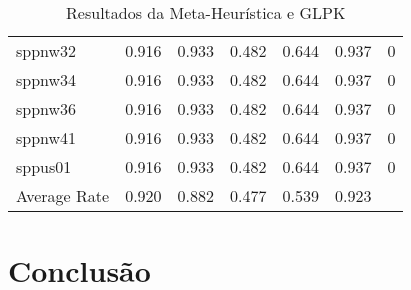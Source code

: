 \documentclass[a4paper, 10pt]{article} %
\begin{document}
\begin{table}[h]
\begin{tabular}{l c c c c c c}
sppnw32 & 0.916 & 0.933 & 0.482 & 0.644 & 0.937 & 0\\
sppnw34 & 0.916 & 0.933 & 0.482 & 0.644 & 0.937 & 0\\
sppnw36 & 0.916 & 0.933 & 0.482 & 0.644 & 0.937 & 0\\
sppnw41 & 0.916 & 0.933 & 0.482 & 0.644 & 0.937 & 0\\
sppus01 & 0.916 & 0.933 & 0.482 & 0.644 & 0.937 & 0\\
\midrule %
\midrule %
Average Rate & 0.920 & 0.882 & 0.477 & 0.539 & 0.923\\ %
\bottomrule %
\end{tabular}
\caption{Resultados da Meta-Heurística e GLPK} %
\label{tab:template} %
\end{table}





\section*{Conclusão}







\end{document}
